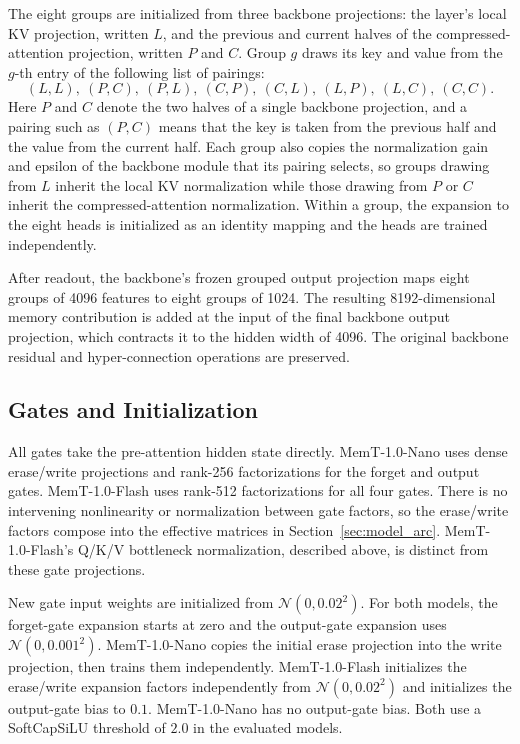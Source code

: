 The eight groups are initialized from three backbone projections: the layer's local KV projection, written $L$, and the previous and current halves of the compressed-attention projection, written $P$ and $C$.
Group $g$ draws its key and value from the $g$-th entry of the following list of pairings:
\begin{equation*}
    (L,L),\ (P,C),\ (P,L),\ (C,P),\ (C,L),\ (L,P),\ (L,C),\ (C,C).
\end{equation*}
Here $P$ and $C$ denote the two halves of a single backbone projection, and a pairing such as $(P,C)$ means that the key is taken from the previous half and the value from the current half.
Each group also copies the normalization gain and epsilon of the backbone module that its pairing selects, so groups drawing from $L$ inherit the local KV normalization while those drawing from $P$ or $C$ inherit the compressed-attention normalization.
Within a group, the expansion to the eight heads is initialized as an identity mapping and the heads are trained independently.

After readout, the backbone's frozen grouped output projection maps eight groups of 4096 features to eight groups of 1024.
The resulting 8192-dimensional memory contribution is added at the input of the final backbone output projection, which contracts it to the hidden width of 4096.
The original backbone residual and hyper-connection operations are preserved.

\subsection{Gates and Initialization}

All gates take the pre-attention hidden state directly.
MemT-1.0-Nano uses dense erase/write projections and rank-256 factorizations for the forget and output gates. MemT-1.0-Flash uses rank-512 factorizations for all four gates.
There is no intervening nonlinearity or normalization between gate factors, so the erase/write factors compose into the effective matrices in Section~\ref{sec:model_arc}.
MemT-1.0-Flash's Q/K/V bottleneck normalization, described above, is distinct from these gate projections.

New gate input weights are initialized from $\mathcal{N}(0,0.02^2)$.
For both models, the forget-gate expansion starts at zero and the output-gate expansion uses $\mathcal{N}(0,0.001^2)$.
MemT-1.0-Nano copies the initial erase projection into the write projection, then trains them independently.
MemT-1.0-Flash initializes the erase/write expansion factors independently from $\mathcal{N}(0,0.02^2)$ and initializes the output-gate bias to $0.1$. 
MemT-1.0-Nano has no output-gate bias.
Both use a SoftCapSiLU threshold of $2.0$ in the evaluated models.

